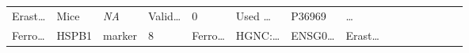 \documentclass[
]{article}
\begin{document}
\begin{longtable}[]{@{}lllllllllllllll@{}}
\begin{minipage}[t]{0.05\columnwidth}
Erast\ldots{}\strut
\end{minipage} & \begin{minipage}[t]{0.04\columnwidth}\raggedright
Mice\strut
\end{minipage} & \begin{minipage}[t]{0.05\columnwidth}\raggedright
\emph{NA}\strut
\end{minipage} & \begin{minipage}[t]{0.05\columnwidth}\raggedright
Valid\ldots{}\strut
\end{minipage} & \begin{minipage}[t]{0.05\columnwidth}\raggedright
0\strut
\end{minipage} & \begin{minipage}[t]{0.05\columnwidth}\raggedright
Used \ldots{}\strut
\end{minipage} & \begin{minipage}[t]{0.05\columnwidth}\raggedright
P36969\strut
\end{minipage} & \begin{minipage}[t]{0.02\columnwidth}\raggedright
\ldots{}\strut
\end{minipage}\tabularnewline
\begin{minipage}[t]{0.05\columnwidth}\raggedright
Ferro\ldots{}\strut
\end{minipage} & \begin{minipage}[t]{0.04\columnwidth}\raggedright
HSPB1\strut
\end{minipage} & \begin{minipage}[t]{0.04\columnwidth}\raggedright
marker\strut
\end{minipage} & \begin{minipage}[t]{0.02\columnwidth}\raggedright
8\strut
\end{minipage} & \begin{minipage}[t]{0.05\columnwidth}\raggedright
Ferro\ldots{}\strut
\end{minipage} & \begin{minipage}[t]{0.05\columnwidth}\raggedright
HGNC:\ldots{}\strut
\end{minipage} & \begin{minipage}[t]{0.05\columnwidth}\raggedright
ENSG0\ldots{}\strut
\end{minipage} & \begin{minipage}[t]{0.05\columnwidth}\raggedright
Erast\ldots{}\strut
\end{minipage} & \begin{minipage}[t]{0.04\columnwidth}\raggedright

\end{minipage}
\end{longtable}
\end{document}
